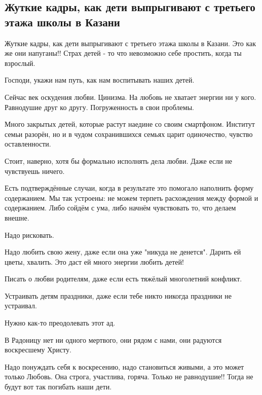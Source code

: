  
 
 
 
 
\subsection{Жуткие кадры, как дети выпрыгивают с третьего этажа школы в Казани}
\label{sec:11_05_2021.fb.pikta_svetlana.1.kazan}

Жуткие кадры, как дети выпрыгивают с третьего этажа школы в Казани. Это как же
они напуганы!! Страх детей - то что невозможно себе простить, когда ты
взрослый. 

Господи, укажи нам путь, как нам воспитывать наших детей.

Сейчас век оскудения любви. Цинизма. На любовь не хватает энергии ни у кого.
Равнодушие друг ко другу. Погруженность в свои проблемы. 

Много закрытых детей, которые растут наедине со своим смартфоном. Институт
семьи разорён, но и в чудом сохранившихся семьях царит одиночество, чувство
оставленности. 

Стоит, наверно, хотя бы формально исполнять дела любви. Даже если не чувствуешь
ничего.

Есть подтверждённые случаи, когда в результате это помогало наполнить форму
содержанием. Мы так устроены: не можем терпеть расхождения между формой и
содержанием. Либо сойдём с ума, либо начнём чувствовать то, что делаем внешне. 

Надо рисковать.

Надо любить свою жену, даже если она уже "никуда не денется". Дарить ей цветы, хвалить. Это даст ей много энергии любить детей!

Писать о любви родителям, даже если есть тяжёлый многолетний конфликт. 

Устраивать детям праздники, даже если тебе никто никогда праздники не устраивал.

Нужно как-то преодолевать этот ад.

В Радоницу нет ни одного мертвого, они рядом с нами, они радуются воскресшему
Христу.

Надо понуждать себя к воскресению, надо становиться живыми, а это может только
Любовь. Она строга, участлива, горяча. Только не равнодушие!!  Тогда не будут
вот так погибать наши дети.


